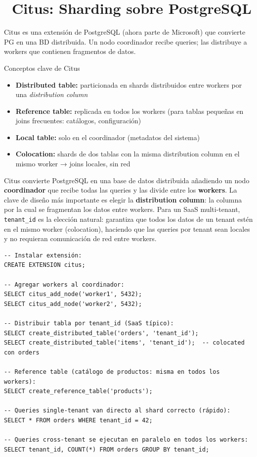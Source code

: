 \section[Citus: Sharding sobre PostgreSQL]{~Citus: Sharding sobre PostgreSQL}

Citus es una extensión de PostgreSQL (ahora parte de Microsoft) que convierte PG en una BD distribuida.
Un nodo coordinador recibe queries; las distribuye a workers que contienen fragmentos de datos.

\begin{teoriabox}{Conceptos clave de Citus}
\begin{itemize}
  \item \textbf{Distributed table:} particionada en shards distribuidos entre workers por una \emph{distribution column}
  \item \textbf{Reference table:} replicada en todos los workers (para tablas pequeñas en joins frecuentes: catálogos, configuración)
  \item \textbf{Local table:} solo en el coordinador (metadatos del sistema)
  \item \textbf{Colocation:} shards de dos tablas con la misma distribution column en el mismo worker → joins locales, sin red
\end{itemize}
\end{teoriabox}

Citus convierte PostgreSQL en una base de datos distribuida añadiendo un nodo \textbf{coordinador} que recibe todas las queries y las divide entre los \textbf{workers}.
La clave de diseño más importante es elegir la \textbf{distribution column}: la columna por la cual se fragmentan los datos entre workers.
Para un SaaS multi-tenant, \texttt{tenant\_id} es la elección natural: garantiza que todos los datos de un tenant estén en el mismo worker (colocation), haciendo que las queries por tenant sean locales y no requieran comunicación de red entre workers.

\begin{lstlisting}[caption={Setup básico de Citus}]
-- Instalar extensión:
CREATE EXTENSION citus;

-- Agregar workers al coordinador:
SELECT citus_add_node('worker1', 5432);
SELECT citus_add_node('worker2', 5432);

-- Distribuir tabla por tenant_id (SaaS típico):
SELECT create_distributed_table('orders', 'tenant_id');
SELECT create_distributed_table('items', 'tenant_id');  -- colocated con orders

-- Reference table (catálogo de productos: misma en todos los workers):
SELECT create_reference_table('products');

-- Queries single-tenant van directo al shard correcto (rápido):
SELECT * FROM orders WHERE tenant_id = 42;

-- Queries cross-tenant se ejecutan en paralelo en todos los workers:
SELECT tenant_id, COUNT(*) FROM orders GROUP BY tenant_id;
\end{lstlisting}

